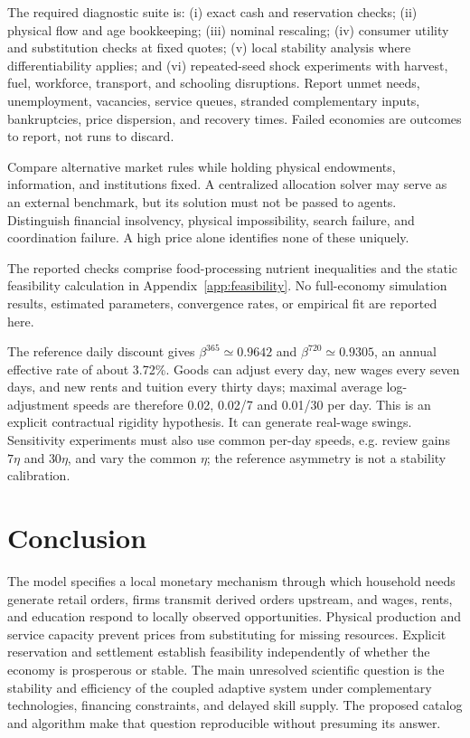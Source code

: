 \documentclass[10pt,a4paper,twocolumn]{article}
\begin{document}
The required diagnostic suite is: (i) exact cash and reservation checks;
(ii) physical flow and age bookkeeping; (iii) nominal rescaling;
(iv) consumer utility and substitution checks at fixed quotes;
(v) local stability analysis where differentiability applies; and
(vi) repeated-seed shock experiments with harvest, fuel, workforce,
transport, and schooling disruptions. Report unmet needs, unemployment,
vacancies, service queues, stranded complementary inputs, bankruptcies,
price dispersion, and recovery times. Failed economies are outcomes to
report, not runs to discard.

Compare alternative market rules while holding physical endowments,
information, and institutions fixed. A centralized allocation solver may
serve as an external benchmark, but its solution must not be passed to
agents. Distinguish financial insolvency, physical impossibility, search
failure, and coordination failure. A high price alone identifies none
of these uniquely.

The reported checks comprise food-processing nutrient inequalities and
the static feasibility calculation in Appendix~\ref{app:feasibility}. No full-economy simulation results, estimated
parameters, convergence rates, or empirical fit are reported here.

The reference daily discount gives $\beta^{365}\simeq0.9642$ and
$\beta^{720}\simeq0.9305$, an annual effective rate of about 3.72\%.
Goods can adjust every day, new wages every seven days, and new rents
and tuition every thirty days; maximal average log-adjustment speeds
are therefore 0.02, 0.02/7 and 0.01/30 per day. This is an explicit
contractual rigidity hypothesis. It can generate real-wage swings.
Sensitivity experiments must also use common per-day speeds, e.g.
review gains $7\eta$ and $30\eta$, and vary the common $\eta$; the
reference asymmetry is not a stability calibration.

\section{Conclusion}
The model specifies a local monetary mechanism through which household
needs generate retail orders, firms transmit derived orders upstream,
and wages, rents, and education respond to locally observed opportunities.
Physical production and service capacity prevent prices from substituting
for missing resources. Explicit reservation and settlement establish
feasibility independently of whether the economy is prosperous or stable.
The main unresolved scientific question is the stability and efficiency
of the coupled adaptive system under complementary technologies,
financing constraints, and delayed skill supply. The proposed catalog and
algorithm make that question reproducible without presuming its answer.
\end{document}
